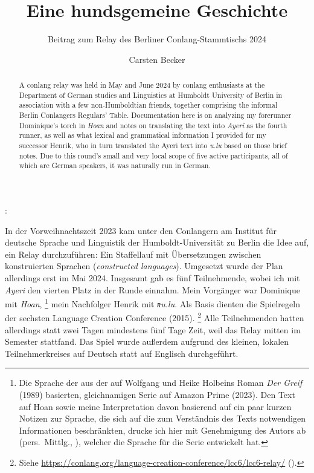 \documentclass[
	12pt,
	ngerman,
]{scrartcl}
\author{Carsten Becker}
\title{Eine hundsgemeine Geschichte}
\subtitle{Beitrag zum Relay des Berliner Conlang-Stammtischs 2024}
\date{\DTMdate{2024-06-21}} %
\let\q\textquote
\newcommand{\fw}[1]{\textit{#1}} %
\newcommand{\tit}[1]{\textit{#1}} %
\newenvironment{mytitle}{
	\hfill
	\begin{minipage}{0.667\textwidth}
	\vspace{\baselineskip}
	\begin{center}
		\Large
		\sffamily\bfseries
		\makeatletter
}{
		\makeatother
	\end{center}
	\vspace{1em}
	\end{minipage}
	\hfill
}
\begin{document}

\begin{mytitle}
	\@title: \@subtitle
\end{mytitle}

\begin{abstract}
A conlang relay was held in May and June 2024 by conlang enthusiasts at the
Department of German studies and Linguistics at Humboldt University of Berlin
in association with a few non-Humboldtian friends, together comprising the
informal Berlin Conlangers Regulars' Table. Documentation here is on analyzing
my forerunner Dominique's torch in \tit{Hoan} and notes on translating the text
into \tit{Ayeri} as the fourth runner, as well as what lexical and grammatical
information I provided for my successor Henrik, who in turn translated the
Ayeri text into \tit{u.lu} based on those brief
notes. Due to this round's small and very local scope of five active
participants, all of which are German speakers, it was naturally run in German.
\end{abstract}

In der Vorweihnachtszeit 2023 kam unter den Conlangern am Institut für deutsche
Sprache und Linguistik der Humboldt-Universität zu Berlin die Idee auf, ein
Relay durchzuführen: Ein Staffellauf mit Übersetzungen zwischen konstruierten
Sprachen (\fw{constructed languages}). Umgesetzt wurde der Plan allerdings erst
im Mai 2024. Insgesamt gab es fünf Teilnehmende, wobei ich mit \tit{Ayeri} den
vierten Platz in der Runde einnahm. Mein Vorgänger war Dominique mit
\tit{Hoan},%
%
	\footnote{Die Sprache der \q{Gehörnten} aus der auf Wolfgang und Heike
	Holbeins Roman \tit{Der Greif} (1989) basierten, gleichnamigen Serie auf
	Amazon Prime (2023). Den Text auf Hoan sowie meine Interpretation davon
	basierend auf ein paar kurzen Notizen zur Sprache, die sich auf die zum
	Verständnis des Texts notwendigen Informationen beschränkten, drucke ich hier
	mit Genehmigung des Autors ab (pers.~Mittlg., ), welcher
	die Sprache für die Serie entwickelt hat.}
%
mein Nachfolger Henrik mit \tit{ʀu.lu}. Als Basis dienten die Spielregeln der
sechsten Language Creation Conference (2015).%
%
	\footnote{Siehe
	\url{https://conlang.org/language-creation-conference/lcc6/lcc6-relay/}
	().}
%
Alle Teilnehmenden hatten allerdings statt zwei Tagen mindestens fünf Tage
Zeit, weil das Relay mitten im Semester stattfand. Das Spiel wurde außerdem
aufgrund des kleinen, lokalen Teilnehmerkreises auf Deutsch statt auf Englisch
durchgeführt.
\end{document}
